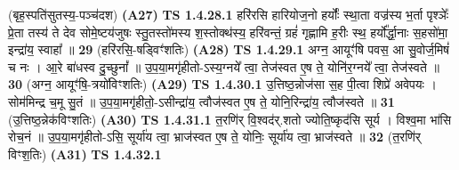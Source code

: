 \documentclass[17pt]{extarticle}
\begin{document}
                  \newline
                      (बृह॒स्पति॑सुतस्य॒-पञ्च॑दश)  \textbf{(A27)} \newline \newline
                                        \textbf{ TS 1.4.28.1} \newline
                  हरि॑रसि हारियोज॒नो हर्योः᳚ स्था॒ता वज्र॑स्य भ॒र्ता पृश्ञेः᳚ प्रे॒ता तस्य॑ ते देव सोमे॒ष्टय॑जुषः स्तु॒तस्तो॑मस्य श॒स्तोक्थ॑स्य॒ हरि॑वन्तं॒ ग्रहं॑ गृह्णामि ह॒रीः स्थ॒ हर्यो᳚र्द्धा॒नाः स॒हसो॑मा॒ इन्द्रा॑य॒ स्वाहा᳚ ॥ \textbf{  29 } \newline
                  \newline
                      (हरि॑रसि॒-षड्विꣳ॑शतिः)  \textbf{(A28)} \newline \newline
                                        \textbf{ TS 1.4.29.1} \newline
                  अग्न॒ आयूꣳ॑षि पवस॒ आ सु॒वोर्ज॒मिषं॑ च नः । आ॒रे बा॑धस्व दु॒च्छुनां᳚ ॥ उ॒प॒या॒मगृ॑हीतो-ऽस्य॒ग्नये᳚ त्वा॒ तेज॑स्वत ए॒ष ते॒ योनि॑र॒ग्नये᳚ त्वा॒ तेज॑स्वते ॥ \textbf{  30 } \newline
                  \newline
                      (अग्न॒ आयूꣳ॑षि॒-त्रयो॑विꣳशतिः)  \textbf{(A29)} \newline \newline
                                        \textbf{ TS 1.4.30.1} \newline
                  उ॒त्तिष्ठ॒न्नोज॑सा स॒ह पी॒त्वा शिप्रे॑ अवेपयः । सोम॑मिन्द्र च॒मू सु॒तं ॥ उ॒प॒या॒मगृ॑हीतो॒-ऽसीन्द्रा॑य॒ त्वौज॑स्वत ए॒ष ते॒ योनि॒रिन्द्रा॑य॒ त्वौज॑स्वते ॥ \textbf{  31} \newline
                  \newline
                      (उ॒त्तिष्ठ॒न्नेक॑विꣳशतिः)  \textbf{(A30)} \newline \newline
                                        \textbf{ TS 1.4.31.1} \newline
                  त॒रणि॑र् वि॒श्वद॑र्.शतो ज्योति॒ष्कृद॑सि सूर्य । विश्व॒मा भा॑सि रोच॒नं ॥ उ॒प॒या॒मगृ॑हीतो-ऽसि॒ सूर्या॑य त्वा॒ भ्राज॑स्वत ए॒ष ते॒ योनिः॒ सूर्या॑य त्वा॒ भ्राज॑स्वते ॥ \textbf{  32 } \newline
                  \newline
                      (त॒रणि॑र् विꣳश॒तिः)  \textbf{(A31)} \newline \newline
                                        \textbf{ TS 1.4.32.1} \newline
\end{document}
